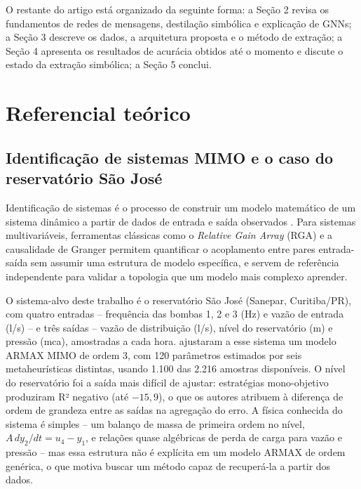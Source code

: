\documentclass[
	article,		%
	12pt,			%
	oneside,
	a4paper,
	brazil
]{abntex2}
\begin{document}
O restante do artigo está organizado da seguinte forma: a Seção 2 revisa
os fundamentos de redes de mensagens, destilação simbólica e explicação de
GNNs; a Seção 3 descreve os dados, a arquitetura proposta e o método de
extração; a Seção 4 apresenta os resultados de acurácia obtidos até o
momento e discute o estado da extração simbólica; a Seção 5 conclui.

\section{Referencial teórico}

\subsection{Identificação de sistemas MIMO e o caso do reservatório São José}

Identificação de sistemas é o processo de construir um modelo matemático de
um sistema dinâmico a partir de dados de entrada e saída observados
\cite{ljung1999}. Para sistemas multivariáveis, ferramentas clássicas como
o \textit{Relative Gain Array} (RGA) \cite{bristol1966, skogestad2005} e a
causalidade de Granger \cite{granger1969} permitem quantificar o
acoplamento entre pares entrada-saída sem assumir uma estrutura de modelo
específica, e servem de referência independente para validar a topologia
que um modelo mais complexo aprender.

O sistema-alvo deste trabalho é o reservatório São José (Sanepar,
Curitiba/PR), com quatro entradas -- frequência das bombas 1, 2 e 3 (Hz) e
vazão de entrada (l/s) -- e três saídas -- vazão de distribuição (l/s),
nível do reservatório (m) e pressão (mca), amostradas a cada hora.
 ajustaram a esse sistema um modelo ARMAX MIMO de
ordem 3, com 120 parâmetros estimados por seis metaheurísticas distintas,
usando 1.100 das 2.216 amostras disponíveis. O nível do reservatório foi a
saída mais difícil de ajustar: estratégias mono-objetivo produziram R²
negativo (até $-15{,}9$), o que os autores atribuem à diferença de ordem de
grandeza entre as saídas na agregação do erro. A física conhecida do
sistema é simples -- um balanço de massa de primeira ordem no nível,
$A\, dy_2/dt = u_4 - y_1$, e relações quase algébricas de perda de carga
para vazão e pressão -- mas essa estrutura não é explícita em um modelo
ARMAX de ordem genérica, o que motiva buscar um método capaz de
recuperá-la a partir dos dados.
\end{document}

